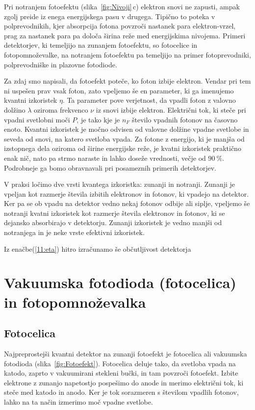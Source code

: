 Pri notranjem fotoefektu (slika~\ref{fig:Nivoji}\,c) elektron snovi ne zapusti, ampak zgolj preide iz enega 
energijskega pasu v drugega. Tipično to poteka v polprevodnikih, kjer absorpcija fotona 
povzroči nastanek para elektron-vrzel, prag za nastanek para pa določa širina reže med 
energijskima nivojema. Primeri detektorjev, ki temeljijo na zunanjem fotoefektu, so 
fotocelice in fotopomnoževalke, na notranjem fotoefektu pa temeljijo na primer
fotoprevodniki, polprevodniške in plazovne fotodiode.

Za zdaj smo napisali, da fotoefekt poteče, ko foton izbije elektron. Vendar pri tem ni 
uspešen prav vsak foton, zato vpeljemo še en parameter, ki ga imenujemo kvantni izkoristek $\eta$.
Ta parameter pove verjetnost, da vpadli foton z valovno dolžino $\lambda$ oziroma frekvenco $\nu$ iz 
snovi izbije elektron. Električni tok, ki steče pri vpadni svetlobni moči $P$, je tako
kje je $n_F$ število vpadnih fotonov na časovno enoto.
Kvantni izkoristek je močno odvisen od valovne dolžine vpadne svetlobe in seveda
od snovi, na katero svetloba vpada. Za fotone z energijo, ki je manjša od izstopnega 
dela oziroma od širine energijske reže, je kvatni izkoristek praktično enak nič, 
nato pa strmo naraste in lahko doseže vrednosti, večje od $90~\%$. Podrobneje ga bomo 
obravnavali pri posameznih primerih detektorjev.

\begin{remark}
V praksi ločimo dve vrsti kvantega izkoristka: zunanji in notranji. Zunanji je vpeljan kot 
razmerje števila izbitih elektronov in fotonov, ki vpadejo na detektor. Ker pa se 
ob vpadu na detektor vedno nekaj fotonov odbije ali siplje, vpeljemo še notranji kvatni 
izkoristek kot razmerje števila elektronov in fotonov, ki se dejansko absorbirajo v detektorju.
Zunanji izkoristek je vedno manjši od notranjega in je neke vrste efektivni izkoristek.
\end{remark}

Iz enačbe(\ref{11:eta}) hitro izračunamo še občutljivost detektorja 

\section{Vakuumska fotodioda (fotocelica) in fotopomnoževalka}
\subsection*{Fotocelica}
Najpreprostejši kvantni detektor na zunanji fotoefekt je fotocelica ali vakuumska fotodioda
(slika~\ref{fig:Fotoefekt}). Fotocelica deluje tako, da svetloba vpada na katodo, 
zaprto v vakuumirani stekleni bučki, in tam povzroči fotoefekt. Izbite elektrone 
z zunanjo napetostjo pospešimo do anode in merimo električni tok, ki steče med 
katodo in anodo. Ker je tok sorazmeren s številom vpadlih fotonov, lahko na ta 
način izmerimo moč vpadne svetlobe.

